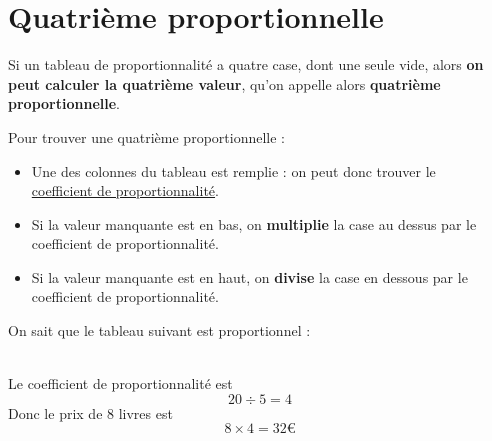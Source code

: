 \documentclass[../€Cours-complet/Cours-complet]{subfiles}
\begin{document}
\section{Quatrième proportionnelle}

\begin{cours}
	Si un tableau de proportionnalité a quatre case, dont une seule vide, alors \textbf{on peut calculer la quatrième valeur}, qu'on appelle alors \textbf{quatrième proportionnelle}.
\end{cours}

\begin{methode}
	Pour trouver une quatrième proportionnelle :
	\begin{itemize}
		\item Une des colonnes du tableau est remplie : on peut donc trouver le \\ \uline{coefficient de proportionnalité}.
		\item Si la valeur manquante est en bas, on \textbf{multiplie} la case au dessus par le coefficient de proportionnalité.
		\item Si la valeur manquante est en haut, on \textbf{divise} la case en dessous par le coefficient de proportionnalité.
	\end{itemize}
\end{methode}

\begin{exemple}
	On sait que le tableau suivant est proportionnel :

	  \\
	Le coefficient de proportionnalité est
	$$ 20 ÷ 5 = 4 $$
	Donc le prix de 8 livres est
	$$ 8 × 4 = 32€ $$
\end{exemple}
\end{document}
